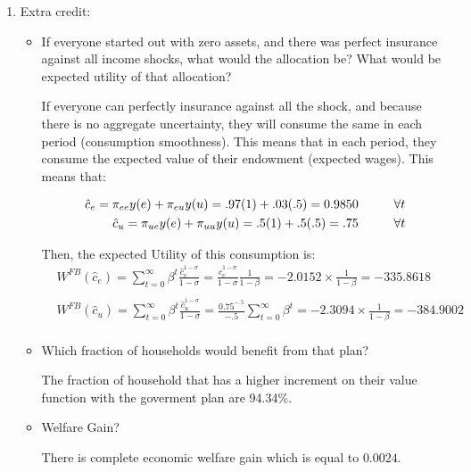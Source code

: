 \documentclass[12pt]{article}%
\newcommand\tab[1][1cm]{\hspace*{#1}}
\begin{document}
\begin{enumerate}
	\item Extra credit:
	
	\begin{itemize}
		\item If everyone started out with zero assets, and there was perfect insurance against all income shocks, what would the allocation be? What would be expected utility of that allocation?
		
		\vspace{1mm}
		
		If everyone can perfectly insurance against all the shock, and because there is no aggregate uncertainty, they will consume the same in each period (consumption smoothness). This means that in each period, they consume the expected value of their endowment (expected wages). This means that:
		
			\begin{align*}
		\hat{c}_e=\pi_{ee}y(e)+\pi_{eu}y(u)={.97}(1)+{.03}(.5)=0.9850  \tab  \forall t \notag \\ 	
		\hat{c}_u=\pi_{ue}y(e)+\pi_{uu}y(u)={.5}(1)+{.5}(.5)=.75   \tab \forall t \notag \\ 			
		\end{align*}
		
		Then, the expected Utility of this consumption is: 
				\begin{align*}
		&W^{FB}(\hat{c}_e)={\sum}_{t=0}^{\infty}\beta^{t}\frac{\hat{c}_e^{1-\sigma}}{1-\sigma}=\frac{\hat{c}_e^{1-\sigma}}{1-\sigma}\frac{1}{1-\beta}=-2.0152\times\frac{1}{1-\beta}=-335.8618\\
		\\
		&W^{FB}(\hat{c}_u)={\sum}_{t=0}^{\infty}\beta^{t}\frac{\hat{c}_u^{1-\sigma}}{1-\sigma}=\frac{0.75^{-.5}}{-.5}{\sum}_{t=0}^{\infty}\beta^{t}=-2.3094\times\frac{1}{1-\beta}=-384.9002\\		 
		\end{align*}
		
		\vspace{1mm}
		
		\item Which fraction of households would benefit from that plan?
			
		\vspace{1mm}
		
		The fraction of household that has a higher increment on their value function with the goverment plan are 94.34\%.
		
		
		
		\item Welfare Gain?
			\vspace{1mm}
		
	 There is complete economic welfare gain which is equal to $0.0024$. 
		
		
	\end{itemize}
	
\end{enumerate}

\strut

\onehalfspacing
\end{document}
